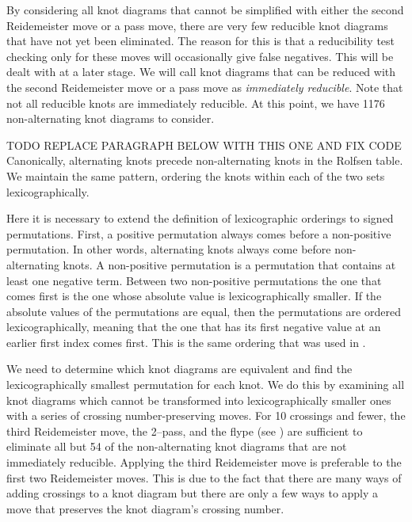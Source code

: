 \begin{paper}

By considering all knot diagrams that cannot be simplified with either the
second Reidemeister move or a pass move, there are very few reducible knot
diagrams that have not yet been eliminated.
The reason for this is that a reducibility test checking only for these moves
will occasionally give false negatives.
This will be dealt with at a later stage.
We will call knot diagrams that can be reduced with the second Reidemeister move
or a pass move as \textit{immediately reducible}.
Note that not all reducible knots are immediately reducible.
At this point, we have 1176 non-alternating knot diagrams to consider.



TODO REPLACE PARAGRAPH BELOW WITH THIS ONE AND FIX CODE
Canonically, alternating knots precede non-alternating knots in the Rolfsen
table.
We maintain the same pattern, ordering the knots within each of the two sets
lexicographically.

Here it is necessary to extend the definition of lexicographic orderings to
signed permutations.
First, a positive permutation always comes before a non-positive permutation.
In other words, alternating knots always come before non-alternating knots.
A non-positive permutation is a permutation that contains at least one negative
term.
Between two non-positive permutations the one that comes first is the one whose
absolute value is lexicographically smaller.
If the absolute values of the permutations are equal, then the permutations are
ordered lexicographically, meaning that the one that has its first negative
value at an earlier first index comes first.
This is the same ordering that was used in \cite{htw}.


We need to determine which knot diagrams are equivalent and find the
lexicographically smallest permutation for each knot.
We do this by examining all knot diagrams which cannot be transformed into
lexicographically smaller ones with a series of crossing number-preserving
moves.
For 10 crossings and fewer, the third Reidemeister move, the 2--pass, and the
flype (see \figMoves) are sufficient to eliminate all but 54 of the
non-alternating knot diagrams that are not immediately reducible.
Applying the third Reidemeister move is preferable to the first two Reidemeister
moves.
This is due to the fact that there are many ways of adding crossings to a knot
diagram but there are only a few ways to apply a move that preserves the knot
diagram's crossing number.


\end{paper}
